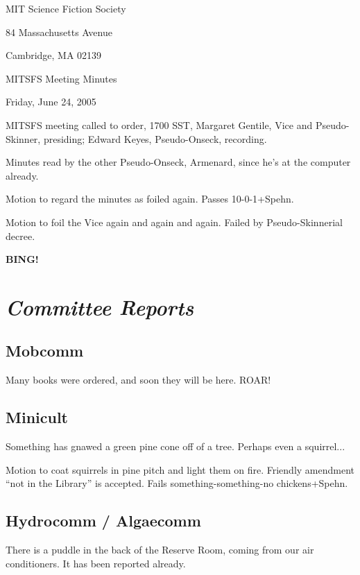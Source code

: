\documentclass[10pt]{article}
\newcommand{\bing}{{\bf BING!} }
\newcommand{\goto}[1]{\bing \vskip 12pt \section*{{\em{#1}}}}
\begin{document}
\begin{center}

MIT Science Fiction Society

84 Massachusetts Avenue

Cambridge, MA 02139

\vspace{12pt}

MITSFS Meeting Minutes

Friday, June 24, 2005

\end{center}

\vspace{18pt}

\setlength{\parskip}{6pt}

\noindent
MITSFS meeting called to order, 1700 SST, Margaret Gentile, Vice and
Pseudo-Skinner, presiding; Edward Keyes, Pseudo-Onseck, recording.

Minutes read by the other Pseudo-Onseck, Armenard, since he's at the
computer already.

Motion to regard the minutes as foiled again.  Passes \hbox{10-0-1+Spehn}.

Motion to foil the Vice again and again and again.  Failed by
Pseudo-Skinnerial decree.

\goto{Committee Reports}

\subsection*{Mobcomm}

Many books were ordered, and soon they will be here.  ROAR!

\subsection*{Minicult}

Something has gnawed a green pine cone off of a tree.  Perhaps even
a squirrel...

Motion to coat squirrels in pine pitch and light them on fire.  Friendly
amendment ``not in the Library'' is accepted.  Fails something-something-no
chickens+Spehn.

\subsection*{Hydrocomm / Algaecomm}

There is a puddle in the back of the Reserve Room, coming from our air
conditioners.  It has been reported already.
\end{document}
